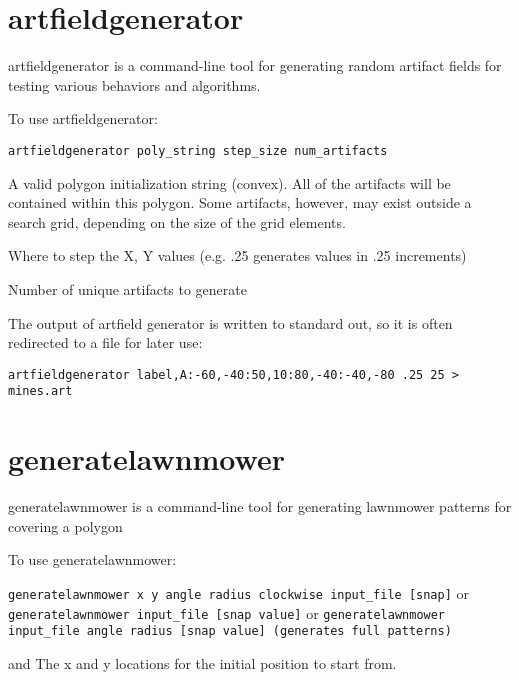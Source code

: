 \section{artfieldgenerator}
\label{app:artfieldgenerator}
artfieldgenerator is a command-line tool for generating random artifact fields for testing various behaviors and algorithms.

To use artfieldgenerator:

\scriptsize
{\tt artfieldgenerator poly\_string step\_size num\_artifacts}
\normalsize

\begin{hangpar}{\pin}{}
A valid polygon initialization string (convex).  All of the artifacts will be contained within this polygon.  Some artifacts, however, may exist outside a search grid, depending on the size of the grid elements.
\end{hangpar}

\begin{hangpar}{\pin}{}
Where to step the X, Y values (e.g. .25 generates values in .25 increments)
\end{hangpar}

\begin{hangpar}{\pin}{}
Number of unique artifacts to generate
\end{hangpar}

The output of artfield generator is written to standard out, so it is often redirected to a file for later use:

\scriptsize
{\tt artfieldgenerator label,A:-60,-40:50,10:80,-40:-40,-80 .25 25 > mines.art}
\normalsize

\section{generatelawnmower}
\label{app:generatelawnmower}
generatelawnmower is a command-line tool for generating lawnmower patterns for covering a polygon

To use generatelawnmower:

\scriptsize
{\tt generatelawnmower x y angle radius clockwise input\_file [snap]}
or {\tt generatelawnmower input\_file [snap value]}
or {\tt generatelawnmower input\_file angle radius [snap value] (generates full patterns)}
\normalsize

\begin{hangpar}{\pin}{ and }
The x and y locations for the initial position to start from.
\end{hangpar}

